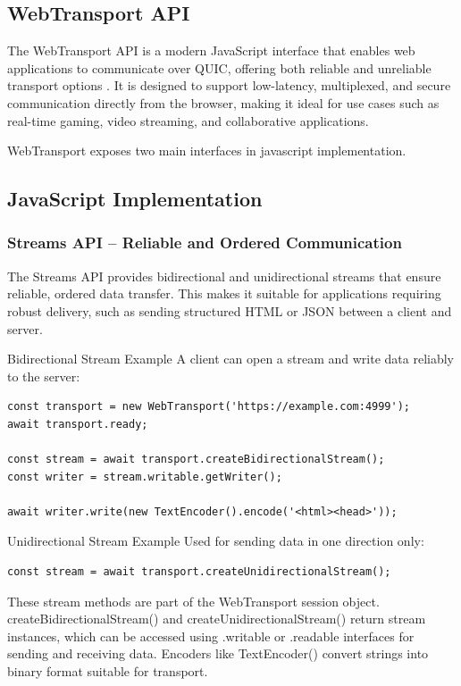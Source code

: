 \subsection{WebTransport API}

The WebTransport API is a modern JavaScript interface that enables web applications to communicate over QUIC, offering both reliable and unreliable transport options \cite{webtransport-mdn}. It is designed to support low-latency, multiplexed, and secure communication directly from the browser, making it ideal for use cases such as real-time gaming, video streaming, and collaborative applications.

WebTransport exposes two main interfaces in javascript implementation.

\subsection{JavaScript Implementation}

\subsubsection{Streams API – Reliable and Ordered Communication}

The Streams API provides bidirectional and unidirectional streams that ensure reliable, ordered data transfer. This makes it suitable for applications requiring robust delivery, such as sending structured HTML or JSON between a client and server.

Bidirectional Stream Example  
A client can open a stream and write data reliably to the server:

\begin{verbatim}
const transport = new WebTransport('https://example.com:4999'); 
await transport.ready; 

const stream = await transport.createBidirectionalStream(); 
const writer = stream.writable.getWriter(); 

await writer.write(new TextEncoder().encode('<html><head>')); 
\end{verbatim}

Unidirectional Stream Example  
Used for sending data in one direction only:

\begin{verbatim}
const stream = await transport.createUnidirectionalStream();
\end{verbatim}

These stream methods are part of the WebTransport session object. createBidirectionalStream() and createUnidirectionalStream() return stream instances, which can be accessed using .writable or .readable interfaces for sending and receiving data. Encoders like TextEncoder() convert strings into binary format suitable for transport.

